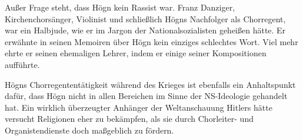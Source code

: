 \begin{figure}
\img{}
\caption{}
\end{figure}

Außer Frage steht, dass Högn kein Rassist war. Franz Danziger,
Kirchenchorsänger, Violinist und schließlich Högns Nachfolger als
Chorregent, war ein Halbjude, wie er im Jargon der Nationalsozialisten
geheißen hätte. Er erwähnte in seinen Memoiren über Högn kein einziges
schlechtes Wort. Viel mehr ehrte er seinen ehemaligen Lehrer, indem er
einige seiner Kompositionen aufführte.

Högns Chorregententätigkeit während des Krieges ist ebenfalls ein
Anhaltspunkt dafür, dass Högn nicht in allen Bereichen im Sinne der
NS-Ideologie gehandelt hat. Ein wirklich überzeugter Anhänger der
Weltanschauung Hitlers hätte versucht Religionen eher zu bekämpfen, als
sie durch Chorleiter- und Organistendienste doch maßgeblich zu fördern.
